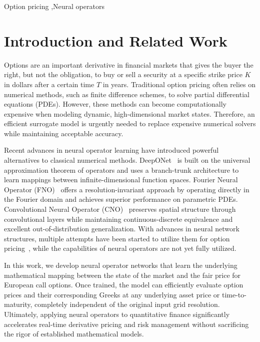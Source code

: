 \documentclass[a4paper,fleqn]{cas-sc}
\begin{document}
\begin{keywords}
Option pricing \sep Neural operators
\end{keywords}

\maketitle



\vspace{-10pt}\section{Introduction and Related Work}\label{}
Options are an important derivative in financial markets that gives the buyer the right, but not the obligation, to buy or sell a security at a specific strike price $K$ in dollars after a certain time $T$ in years. Traditional option pricing often relies on numerical methods, such as finite difference schemes, to solve partial differential equations (PDEs). However, these methods can become computationally expensive when modeling dynamic, high-dimensional market states. Therefore, an efficient surrogate model is urgently needed to replace expensive numerical solvers while maintaining acceptable accuracy.

Recent advances in neural operator learning have introduced powerful alternatives to classical numerical methods. DeepONet~\cite{Lu2021DeepONet} is built on the universal approximation theorem of operators and uses a branch-trunk architecture to learn mappings between infinite-dimensional function spaces. Fourier Neural Operator (FNO)~\cite{Li2021FNO} offers a resolution-invariant approach by operating directly in the Fourier domain and achieves superior performance on parametric PDEs. Convolutional Neural Operator (CNO)~\cite{Raonic2023CNO} preserves spatial structure through convolutional layers while maintaining continuous-discrete equivalence and excellent out-of-distribution generalization. With advances in neural network structures, multiple attempts have been started to utilize them for option pricing~\cite{alonso2025neural,lee2026deeponet,elbayed2025hybrid}, while the capabilities of neural operators are not yet fully utilized.

In this work, we develop neural operator networks that learn the underlying mathematical mapping between the state of the market and the fair price for European call options. Once trained, the model can efficiently evaluate option prices and their corresponding Greeks at any underlying asset price or time-to-maturity, completely independent of the original input grid resolution. Ultimately, applying neural operators to quantitative finance significantly accelerates real-time derivative pricing and risk management without sacrificing the rigor of established mathematical models.
\end{document}
